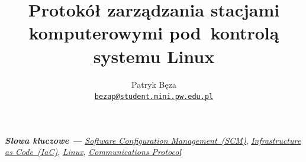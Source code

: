 \documentclass[12pt,a4paper]{article}
\begin{document}

\thispagestyle{empty}
\title{\textbf{Protokół zarządzania stacjami komputerowymi pod~kontrolą systemu Linux}}
\author{Patryk Bęza\\[-8pt]
\small \texttt{\href{mailto:bezap@student.mini.pw.edu.pl}{bezap@student.mini.pw.edu.pl}}%
}
\date{}

\maketitle
\providecommand{\keywords}[1]{\textbf{\textit{Słowa kluczowe ---}} #1}
\keywords{\emph{\href{https://en.wikipedia.org/wiki/Software_configuration_management}{Software Configuration Management~(SCM)}}, \emph{\href{https://en.wikipedia.org/wiki/Infrastructure_as_Code}{Infrastructure as Code~(IaC)}}, \emph{\href{https://en.wikipedia.org/wiki/Linux}{Linux}}, \emph{\href{https://en.wikipedia.org/wiki/Communications_protocol}{Communications Protocol}}}
\global\let\newpage\newpagegood
\thispagestyle{empty}
\end{document}
